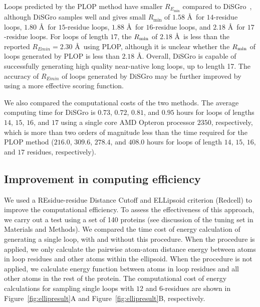 Loops predicted by the PLOP method have smaller $R_{E_{\min}}$
compared to {\sc DiSGro}~\cite{zhao2011}, although {\sc DiSGro}
samples well and gives small $R_{\min}$ of $1.58$ \r{A}\ for
$14$-residue loops, $1.80$ \r{A}\ for $15$-residue loops, $1.88$
\r{A}\ for $16$-residue loops, and $2.18$ \r{A}\ for $17$-residue
loops. For loops of length $17$, the $R_{\rm min}$ of $2.18$ \r{A}\
is less than the reported $R_{Emin}=2.30$ \r{A}\ using PLOP,
although it is unclear whether the $R_{\rm min}$ of loops generated
by PLOP is less than $2.18$ \r{A}. Overall, {\sc DiSGro} is capable
of successfully generating high quality near-native long loops, up
to length 17. The accuracy of $R_{Emin}$ of loops generated by {\sc
DiSGro} may be further improved by using a more effective scoring
function.

We also compared the computational costs of the two methods. The
average computing time for {\sc DiSGro} is $0.73$, $0.72$, $0.81$,
and $0.95$ hours for loops of lengths $14$, $15$, $16$, and $17$
using a single core AMD Opteron processor $2350$, respectively,
which is more than two orders of magnitude less than the time
required for the PLOP method ($216.0$, $309.6$, $278.4$, and $408.0$
hours for loops of length $14$, $15$, $16$, and $17$ residues,
respectively).


\subsection*{Improvement in computing efficiency}

We used a REsidue-residue Distance Cutoff and ELLipsoid criterion
({\sc Redcell}) to improve the computational efficiency. To assess
the effectiveness of this approach, we carry out a test using a set
of 140 proteins (see discussion of the tuning set in Materials and
Methods). We compared the time cost of energy calculation of
generating a single loop, with and without this procedure. When the
procedure is applied, we only calculate the pairwise atom-atom
distance energy between atoms in loop residues and other atoms
within the ellipsoid. When the procedure is not applied, we
calculate energy function between atoms in loop residues and all
other atoms in the rest of the protein. The computational cost of
energy calculations for sampling single loops with $12$ and
$6$-residues are shown in Figure~\ref{fig:ellipresult}A and
Figure~\ref{fig:ellipresult}B, respectively.


